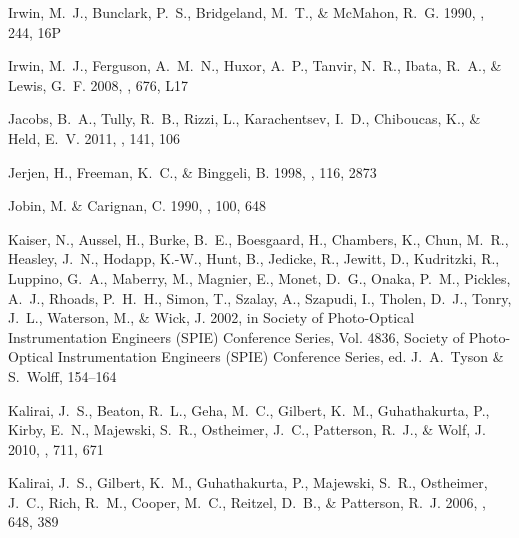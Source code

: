 \documentclass[manuscript]{aastex}
\begin{document}
\begin{thebibliography}{381}
{Irwin}, M.~J., {Bunclark}, P.~S., {Bridgeland}, M.~T., \& {McMahon}, R.~G.
  1990, \mnras, 244, 16P

{Irwin}, M.~J., {Ferguson}, A.~M.~N., {Huxor}, A.~P., {Tanvir}, N.~R., {Ibata},
  R.~A., \& {Lewis}, G.~F. 2008, \apjl, 676, L17

{Jacobs}, B.~A., {Tully}, R.~B., {Rizzi}, L., {Karachentsev}, I.~D.,
  {Chiboucas}, K., \& {Held}, E.~V. 2011, \aj, 141, 106

{Jerjen}, H., {Freeman}, K.~C., \& {Binggeli}, B. 1998, \aj, 116, 2873

{Jobin}, M. \& {Carignan}, C. 1990, \aj, 100, 648

{Kaiser}, N., {Aussel}, H., {Burke}, B.~E., {Boesgaard}, H., {Chambers}, K.,
  {Chun}, M.~R., {Heasley}, J.~N., {Hodapp}, K.-W., {Hunt}, B., {Jedicke}, R.,
  {Jewitt}, D., {Kudritzki}, R., {Luppino}, G.~A., {Maberry}, M., {Magnier},
  E., {Monet}, D.~G., {Onaka}, P.~M., {Pickles}, A.~J., {Rhoads}, P.~H.~H.,
  {Simon}, T., {Szalay}, A., {Szapudi}, I., {Tholen}, D.~J., {Tonry}, J.~L.,
  {Waterson}, M., \& {Wick}, J. 2002, in Society of Photo-Optical
  Instrumentation Engineers (SPIE) Conference Series, Vol. 4836, Society of
  Photo-Optical Instrumentation Engineers (SPIE) Conference Series, ed.
  {J.~A.~Tyson \& S.~Wolff}, 154--164

{Kalirai}, J.~S., {Beaton}, R.~L., {Geha}, M.~C., {Gilbert}, K.~M.,
  {Guhathakurta}, P., {Kirby}, E.~N., {Majewski}, S.~R., {Ostheimer}, J.~C.,
  {Patterson}, R.~J., \& {Wolf}, J. 2010, \apj, 711, 671

{Kalirai}, J.~S., {Gilbert}, K.~M., {Guhathakurta}, P., {Majewski}, S.~R.,
  {Ostheimer}, J.~C., {Rich}, R.~M., {Cooper}, M.~C., {Reitzel}, D.~B., \&
  {Patterson}, R.~J. 2006, \apj, 648, 389


\end{thebibliography}
\end{document}
